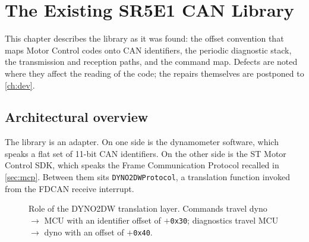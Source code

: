 \chapter{The Existing SR5E1 CAN Library}
\label{ch:arch}

This chapter describes the library as it was found: the offset convention
that maps Motor Control codes onto CAN identifiers, the periodic diagnostic
stack, the transmission and reception paths, and the command map. Defects
are noted where they affect the reading of the code; the repairs themselves
are postponed to \cref{ch:dev}.

\section{Architectural overview}
\label{sec:arch-overview}

The library is an adapter. On one side is the dynamometer software, which
speaks a flat set of 11-bit CAN identifiers. On the other side is the ST
Motor Control SDK, which speaks the Frame Communication Protocol recalled
in \cref{sec:mcp}. Between them sits \texttt{DYNO2DWProtocol}, a translation
function invoked from the FDCAN receive interrupt.

\begin{figure}[ht]
\centering
{}
\caption{Role of the DYNO2DW translation layer. Commands travel dyno
$\rightarrow$ MCU with an identifier offset of $+$\texttt{0x30}; diagnostics
travel MCU $\rightarrow$ dyno with an offset of $+$\texttt{0x40}.}
\label{fig:arch}
\end{figure}

